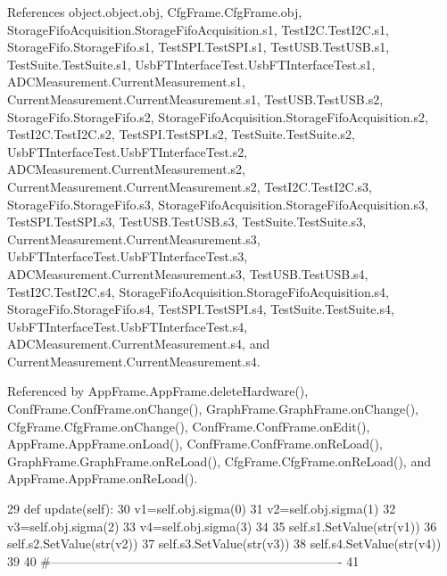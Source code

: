 References object.\+object.\+obj, Cfg\+Frame.\+Cfg\+Frame.\+obj, Storage\+Fifo\+Acquisition.\+Storage\+Fifo\+Acquisition.\+s1, Test\+I2\+C.\+Test\+I2\+C.\+s1, Storage\+Fifo.\+Storage\+Fifo.\+s1, Test\+S\+P\+I.\+Test\+S\+P\+I.\+s1, Test\+U\+S\+B.\+Test\+U\+S\+B.\+s1, Test\+Suite.\+Test\+Suite.\+s1, Usb\+F\+T\+Interface\+Test.\+Usb\+F\+T\+Interface\+Test.\+s1, A\+D\+C\+Measurement.\+Current\+Measurement.\+s1, Current\+Measurement.\+Current\+Measurement.\+s1, Test\+U\+S\+B.\+Test\+U\+S\+B.\+s2, Storage\+Fifo.\+Storage\+Fifo.\+s2, Storage\+Fifo\+Acquisition.\+Storage\+Fifo\+Acquisition.\+s2, Test\+I2\+C.\+Test\+I2\+C.\+s2, Test\+S\+P\+I.\+Test\+S\+P\+I.\+s2, Test\+Suite.\+Test\+Suite.\+s2, Usb\+F\+T\+Interface\+Test.\+Usb\+F\+T\+Interface\+Test.\+s2, A\+D\+C\+Measurement.\+Current\+Measurement.\+s2, Current\+Measurement.\+Current\+Measurement.\+s2, Test\+I2\+C.\+Test\+I2\+C.\+s3, Storage\+Fifo.\+Storage\+Fifo.\+s3, Storage\+Fifo\+Acquisition.\+Storage\+Fifo\+Acquisition.\+s3, Test\+S\+P\+I.\+Test\+S\+P\+I.\+s3, Test\+U\+S\+B.\+Test\+U\+S\+B.\+s3, Test\+Suite.\+Test\+Suite.\+s3, Current\+Measurement.\+Current\+Measurement.\+s3, Usb\+F\+T\+Interface\+Test.\+Usb\+F\+T\+Interface\+Test.\+s3, A\+D\+C\+Measurement.\+Current\+Measurement.\+s3, Test\+U\+S\+B.\+Test\+U\+S\+B.\+s4, Test\+I2\+C.\+Test\+I2\+C.\+s4, Storage\+Fifo\+Acquisition.\+Storage\+Fifo\+Acquisition.\+s4, Storage\+Fifo.\+Storage\+Fifo.\+s4, Test\+S\+P\+I.\+Test\+S\+P\+I.\+s4, Test\+Suite.\+Test\+Suite.\+s4, Usb\+F\+T\+Interface\+Test.\+Usb\+F\+T\+Interface\+Test.\+s4, A\+D\+C\+Measurement.\+Current\+Measurement.\+s4, and Current\+Measurement.\+Current\+Measurement.\+s4.



Referenced by App\+Frame.\+App\+Frame.\+delete\+Hardware(), Conf\+Frame.\+Conf\+Frame.\+on\+Change(), Graph\+Frame.\+Graph\+Frame.\+on\+Change(), Cfg\+Frame.\+Cfg\+Frame.\+on\+Change(), Conf\+Frame.\+Conf\+Frame.\+on\+Edit(), App\+Frame.\+App\+Frame.\+on\+Load(), Conf\+Frame.\+Conf\+Frame.\+on\+Re\+Load(), Graph\+Frame.\+Graph\+Frame.\+on\+Re\+Load(), Cfg\+Frame.\+Cfg\+Frame.\+on\+Re\+Load(), and App\+Frame.\+App\+Frame.\+on\+Re\+Load().


\begin{DoxyCode}
29     \textcolor{keyword}{def }update(self):
30         v1=self.obj.sigma(0)
31         v2=self.obj.sigma(1)
32         v3=self.obj.sigma(2)
33         v4=self.obj.sigma(3)
34 
35         self.s1.SetValue(str(v1))
36         self.s2.SetValue(str(v2))
37         self.s3.SetValue(str(v3))
38         self.s4.SetValue(str(v4))        
39 
40 \textcolor{comment}{#----------------------------------------------------------------------}
41 
\end{DoxyCode}



